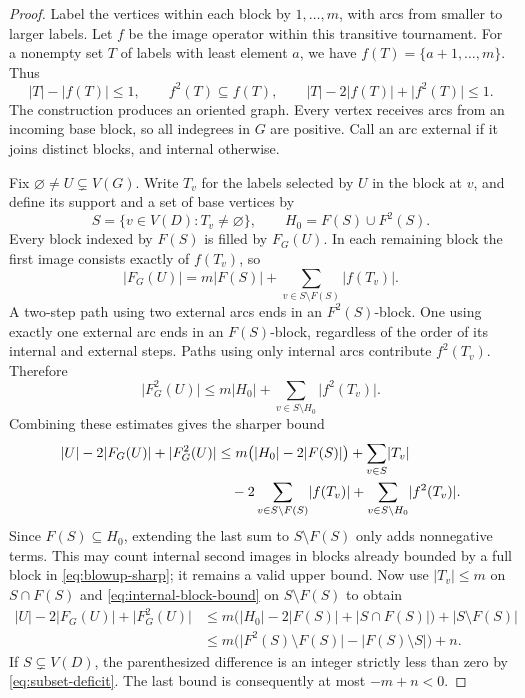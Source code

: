 \documentclass[11pt]{article}
\theoremstyle{remark}
\newcommand{\abs}[1]{\lvert #1\rvert}
\begin{document}
\begin{proof}
Label the vertices within each block by $1,\ldots,m$, with arcs from
smaller to larger labels.  Let $f$ be the image operator within this
transitive tournament.  For a nonempty set $T$ of labels with least
element $a$, we have $f(T)=\{a+1,\ldots,m\}$.  Thus
\begin{equation}
\label{eq:internal-block-bound}
  \abs{T}-\abs{f(T)}\le1,\qquad
  f^2(T)\subseteq f(T),\qquad
  \abs{T}-2\abs{f(T)}+\abs{f^2(T)}\le1.
\end{equation}
The construction produces an oriented graph.  Every vertex receives
arcs from an incoming base block, so all indegrees in $G$ are positive.
Call an arc external if it joins distinct blocks, and internal otherwise.

Fix $\varnothing\ne U\subsetneq V(G)$.  Write $T_v$ for the labels
selected by $U$ in the block at $v$, and define its support and a set
of base vertices by
\[
  S=\{v\in V(D):T_v\ne\varnothing\},\qquad
  H_0=F(S)\cup F^2(S).
\]
Every block indexed by $F(S)$ is filled by $F_G(U)$.  In each remaining
block the first image consists exactly of $f(T_v)$, so
\[
  \abs{F_G(U)}=m\abs{F(S)}
     +\sum_{v\in S\setminus F(S)}\abs{f(T_v)}.
\]
A two-step path using two external arcs ends in an $F^2(S)$-block.
One using exactly one external arc ends in an $F(S)$-block, regardless
of the order of its internal and external steps.  Paths using only
internal arcs contribute $f^2(T_v)$.  Therefore
\[
  \abs{F_G^2(U)}\le m\abs{H_0}
     +\sum_{v\in S\setminus H_0}\abs{f^2(T_v)}.
\]
Combining these estimates gives the sharper bound
\begin{align}
\label{eq:blowup-sharp}
  \abs{U}-2\abs{F_G(U)}+\abs{F_G^2(U)}
  &\le m\bigl(\abs{H_0}-2\abs{F(S)}\bigr)
       +\sum_{v\in S}\abs{T_v} \notag\\
  &\quad -2\sum_{v\in S\setminus F(S)}\abs{f(T_v)}
       +\sum_{v\in S\setminus H_0}\abs{f^2(T_v)}.
\end{align}
Since $F(S)\subseteq H_0$, extending the last sum to
$S\setminus F(S)$ only adds nonnegative terms.  This may count internal
second images in blocks already bounded by a full block in
\eqref{eq:blowup-sharp}; it remains a valid upper bound.  Now use
$\abs{T_v}\le m$ on $S\cap F(S)$ and
\eqref{eq:internal-block-bound} on $S\setminus F(S)$ to obtain
\begin{align*}
  \abs{U}-2\abs{F_G(U)}+\abs{F_G^2(U)}
  &\le m\bigl(\abs{H_0}-2\abs{F(S)}
                    +\abs{S\cap F(S)}\bigr)
       +\abs{S\setminus F(S)}\\
  &\le m\bigl(\abs{F^2(S)\setminus F(S)}
                    -\abs{F(S)\setminus S}\bigr)+n.
\end{align*}
If $S\subsetneq V(D)$, the parenthesized difference is an integer
strictly less than zero by \eqref{eq:subset-deficit}.  The last bound
is consequently at most $-m+n<0$.


\end{proof}
\end{document}
